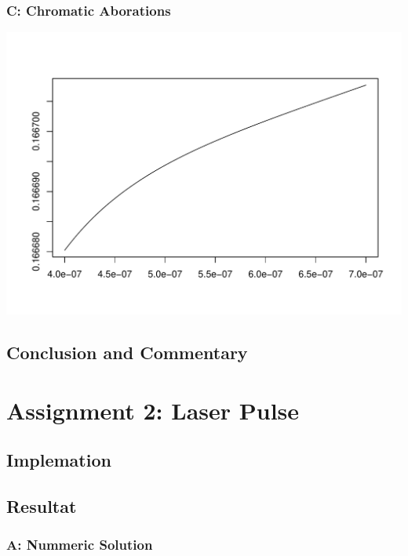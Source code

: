 \documentclass[12pt]{article}
\begin{document}
\subsubsection{C: Chromatic Aborations}
\includegraphics[scale=1.0]{BK7_abo.pdf}

\subsection{Conclusion and Commentary}

\section{Assignment 2: Laser Pulse}

\subsection{Implemation}

\subsection{Resultat}
\subsubsection{A: Nummeric Solution}
\end{document}

